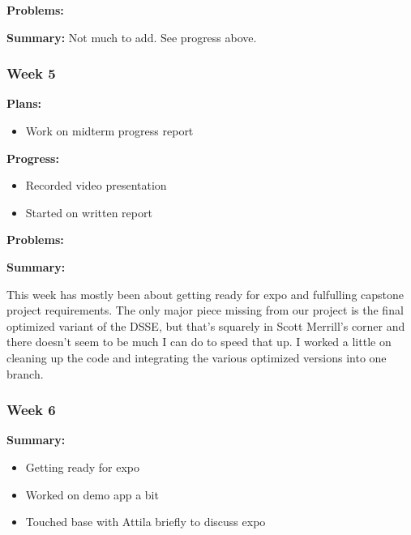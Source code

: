 \noindent \textbf{Problems: }

\noindent \textbf{Summary: }
Not much to add. See progress above.


\subsubsection{Week 5}
\noindent \textbf{Plans: }

\begin{itemize}
\item     Work on midterm progress report
\end{itemize}



\noindent \textbf{Progress: }

\begin{itemize}
\item     Recorded video presentation

\item     Started on written report
\end{itemize}

\noindent \textbf{Problems: }


\noindent \textbf{Summary: }

This week has mostly been about getting ready for expo and fulfulling capstone project requirements. The only major piece missing from our project is the final optimized variant of the DSSE, but that's squarely in Scott Merrill's corner and there doesn't seem to be much I can do to speed that up. I worked a little on cleaning up the code and integrating the various optimized versions into one branch. 

\subsubsection{Week 6}

\noindent \textbf{Summary: }

\begin{itemize}
\item     Getting ready for expo

\item     Worked on demo app a bit

\item     Touched base with Attila briefly to discuss expo
\end{itemize}


